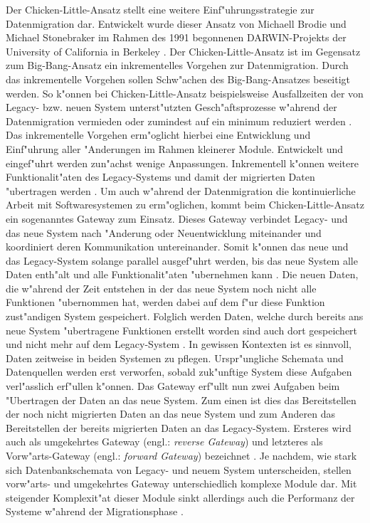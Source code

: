 Der Chicken-Little-Ansatz stellt eine weitere Einf"uhrungsstrategie zur Datenmigration dar. Entwickelt wurde dieser Ansatz von Michaell Brodie und Michael Stonebraker im Rahmen des 1991 begonnenen DARWIN-Projekts der University of California in Berkeley \citep{zoulafy-2002}. Der Chicken-Little-Ansatz ist im Gegensatz zum Big-Bang-Ansatz ein inkrementelles Vorgehen zur Datenmigration. Durch das inkrementelle Vorgehen sollen Schw"achen des Big-Bang-Ansatzes beseitigt werden. So k"onnen bei Chicken-Little-Ansatz beispielsweise Ausfallzeiten der von Legacy- bzw. neuen System unterst"utzten Gesch"aftsprozesse w"ahrend der Datenmigration vermieden oder zumindest auf ein minimum reduziert werden \citep{zoulafy-2002}.
\lb
Das inkrementelle Vorgehen erm"oglicht hierbei eine Entwicklung und Einf"uhrung aller "Anderungen im Rahmen kleinerer Module. Entwickelt und eingef"uhrt werden zun"achst wenige Anpassungen. Inkrementell k"onnen weitere Funktionalit"aten des Legacy-Systems und damit der migrierten Daten "ubertragen werden \citep[S.~2]{wuLawless-1997}.
\lb
Um auch w"ahrend der Datenmigration die kontinuierliche Arbeit mit Softwaresystemen zu erm"oglichen, kommt beim Chicken-Little-Ansatz ein sogenanntes Gateway zum Einsatz. Dieses Gateway verbindet Legacy- und das neue System nach "Anderung oder Neuentwicklung miteinander und koordiniert deren Kommunikation untereinander. Somit k"onnen das neue und das Legacy-System solange parallel ausgef"uhrt werden, bis das neue System alle Daten enth"alt und alle Funktionalit"aten "ubernehmen kann \citep[S.~2]{wuLawless-1997}. Die neuen Daten, die w"ahrend der Zeit entstehen in der das neue System noch nicht alle Funktionen "ubernommen hat, werden dabei auf dem f"ur diese Funktion zust"andigen System gespeichert. Folglich werden Daten, welche durch bereits ans neue System "ubertragene Funktionen erstellt worden sind auch dort gespeichert und nicht mehr auf dem Legacy-System \citep[S.~2]{wuLawless-1997}. In gewissen Kontexten ist es sinnvoll, Daten zeitweise in beiden Systemen zu pflegen. Urspr"ungliche Schemata und Datenquellen werden erst verworfen, sobald zuk"unftige System diese Aufgaben verl"asslich erf"ullen k"onnen.
\lb
Das Gateway erf"ullt nun zwei Aufgaben beim "Ubertragen der Daten an das neue System. Zum einen ist dies das Bereitstellen der noch nicht migrierten Daten an das neue System und zum Anderen das Bereitstellen der bereits migrierten Daten an das Legacy-System. Ersteres wird auch als umgekehrtes Gateway (engl.: \textit{reverse Gateway}) und letzteres als Vorw"arts-Gateway (engl.: \textit{forward Gateway}) bezeichnet \citep[S.~2]{wuLawless-1997}. Je nachdem, wie stark sich Datenbankschemata von Legacy- und neuem System unterscheiden, stellen vorw"arts- und umgekehrtes Gateway unterschiedlich komplexe Module dar. Mit steigender Komplexit"at dieser Module sinkt allerdings auch die Performanz der Systeme w"ahrend der Migrationsphase \citep[S.~109]{bisbal-1999}.

